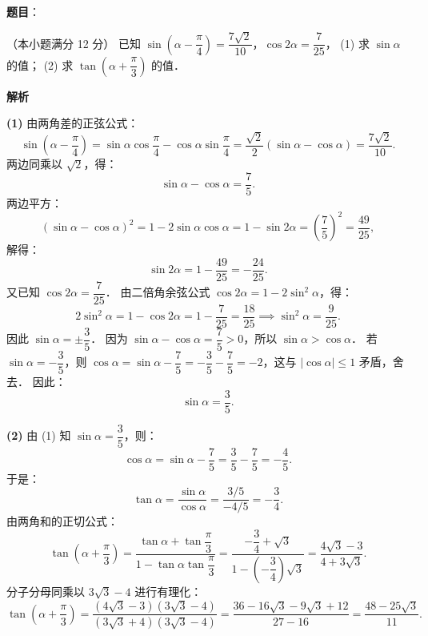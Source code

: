 \begin{answer}

\textbf{题目}：

（本小题满分 12 分）
已知 $\sin\left(\alpha - \dfrac{\pi}{4}\right) = \dfrac{7\sqrt{2}}{10}$，$\cos 2\alpha = \dfrac{7}{25}$，
(1) 求 $\sin\alpha$ 的值；
(2) 求 $\tan\left(\alpha + \dfrac{\pi}{3}\right)$ 的值．

\textbf{解析}

\textbf{(1)}
由两角差的正弦公式：
\nopagebreak[4]
\[
\sin\left(\alpha - \dfrac{\pi}{4}\right) = \sin\alpha\cos\dfrac{\pi}{4} - \cos\alpha\sin\dfrac{\pi}{4} = \dfrac{\sqrt{2}}{2}(\sin\alpha - \cos\alpha) = \dfrac{7\sqrt{2}}{10}.
\]
两边同乘以 $\sqrt{2}$，得：
\nopagebreak[4]
\[
\sin\alpha - \cos\alpha = \dfrac{7}{5}.
\]
两边平方：
\nopagebreak[4]
\[
(\sin\alpha - \cos\alpha)^2 = 1 - 2\sin\alpha\cos\alpha = 1 - \sin 2\alpha = \left(\dfrac{7}{5}\right)^2 = \dfrac{49}{25},
\]
解得：
\nopagebreak[4]
\[
\sin 2\alpha = 1 - \dfrac{49}{25} = -\dfrac{24}{25}.
\]
又已知 $\cos 2\alpha = \dfrac{7}{25}$．
由二倍角余弦公式 $\cos 2\alpha = 1 - 2\sin^2\alpha$，得：
\nopagebreak[4]
\[
2\sin^2\alpha = 1 - \cos 2\alpha = 1 - \dfrac{7}{25} = \dfrac{18}{25} \implies \sin^2\alpha = \dfrac{9}{25}.
\]
因此 $\sin\alpha = \pm \dfrac{3}{5}$．
因为 $\sin\alpha - \cos\alpha = \dfrac{7}{5} > 0$，所以 $\sin\alpha > \cos\alpha$．
若 $\sin\alpha = -\dfrac{3}{5}$，则 $\cos\alpha = \sin\alpha - \dfrac{7}{5} = -\dfrac{3}{5} - \dfrac{7}{5} = -2$，这与 $|\cos\alpha| \leqslant 1$ 矛盾，舍去．
因此：
\nopagebreak[4]
\[
\sin\alpha = \dfrac{3}{5}.
\]

\textbf{(2)}
由 (1) 知 $\sin\alpha = \dfrac{3}{5}$，则：
\nopagebreak[4]
\[
\cos\alpha = \sin\alpha - \dfrac{7}{5} = \dfrac{3}{5} - \dfrac{7}{5} = -\dfrac{4}{5}.
\]
于是：
\nopagebreak[4]
\[
\tan\alpha = \dfrac{\sin\alpha}{\cos\alpha} = \dfrac{3/5}{-4/5} = -\dfrac{3}{4}.
\]
由两角和的正切公式：
\nopagebreak[4]
\[
\tan\left(\alpha + \dfrac{\pi}{3}\right) = \dfrac{\tan\alpha + \tan\dfrac{\pi}{3}}{1 - \tan\alpha\tan\dfrac{\pi}{3}} = \dfrac{-\dfrac{3}{4} + \sqrt{3}}{1 - \left(-\dfrac{3}{4}\right)\sqrt{3}} = \dfrac{4\sqrt{3} - 3}{4 + 3\sqrt{3}}.
\]
分子分母同乘以 $3\sqrt{3} - 4$ 进行有理化：
\nopagebreak[4]
\[
\tan\left(\alpha + \dfrac{\pi}{3}\right) = \dfrac{(4\sqrt{3} - 3)(3\sqrt{3} - 4)}{(3\sqrt{3} + 4)(3\sqrt{3} - 4)} = \dfrac{36 - 16\sqrt{3} - 9\sqrt{3} + 12}{27 - 16} = \dfrac{48 - 25\sqrt{3}}{11}.
\]



\end{answer}
